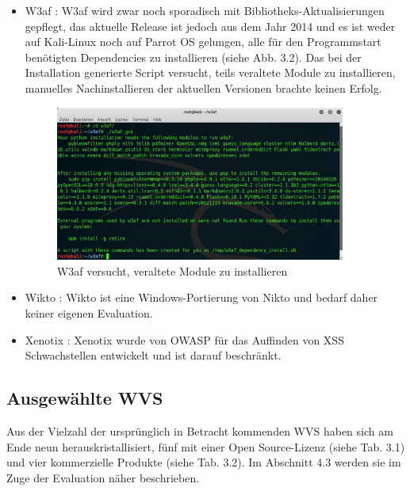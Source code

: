 \documentclass[12pt,oneside,a4paper,parskip,pointlessnumbers]{scrbook}
\begin{document}
\begin{itemize}
      \newpage
      \item W3af \cite{W3af}: W3af wird zwar noch sporadisch mit Bibliotheks-Aktualisierungen gepflegt, das aktuelle Release ist jedoch aus dem Jahr 2014 und es ist weder auf Kali-Linux noch auf Parrot OS gelungen, alle für den Programmstart benötigten Dependencies zu installieren (siehe Abb. 3.2). Das bei der Installation generierte Script versucht, teils veraltete Module zu installieren, manuelles Nachinstallieren der aktuellen Versionen brachte keinen Erfolg.
      \begin{figure}[H]
        \centering
        \includegraphics[width=0.9\textwidth]{Images/w3af}
        \caption[W3af: Fehlende Module]{W3af versucht, veraltete Module zu installieren}
      \end{figure}
      \item Wikto \cite{Wikto}: Wikto ist eine Windows-Portierung von Nikto und bedarf daher keiner eigenen Evaluation.
      \item Xenotix \cite{Xenotix}: Xenotix wurde von OWASP für das Auffinden von XSS Schwachstellen entwickelt und ist darauf beschränkt.
    \end{itemize}
    \newpage


  \subsection{Ausgewählte WVS}
  Aus der Vielzahl der ursprünglich in Betracht kommenden WVS haben sich am Ende neun herauskristallisiert, fünf mit einer Open Source-Lizenz (siehe Tab. 3.1) und vier kommerzielle Produkte (siehe Tab. 3.2). Im Abschnitt 4.3 werden sie im Zuge der Evaluation näher beschrieben.
\end{document}
